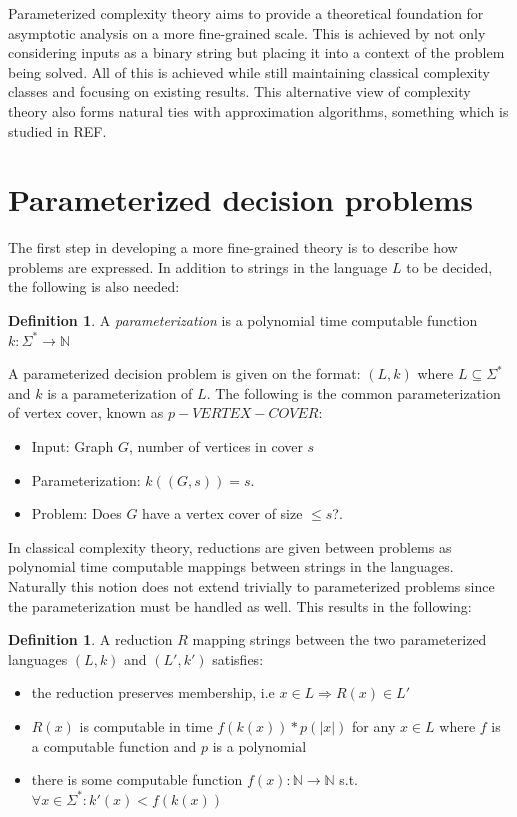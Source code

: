 \documentclass[a4paper,11pt,notitlepage]{report}
\theoremstyle{plain}
\theoremstyle{definition}
\newtheorem{defn}[thm]{Definition} %
\begin{document}
Parameterized complexity theory aims to provide a theoretical foundation for asymptotic analysis on a more fine-grained scale.
This is achieved by not only considering inputs as a binary string but placing it into a context of the problem being solved.
All of this is achieved while still maintaining classical complexity classes and focusing on existing results.
This alternative view of complexity theory also forms natural ties with approximation algorithms, something which is studied in REF.

\section{Parameterized decision problems}
The first step in developing a more fine-grained theory is to describe how problems are expressed.
In addition to strings in the language $L$ to be decided, the following is also needed:

\begin{defn}
A \emph{parameterization} is a polynomial time computable function $k : \Sigma^* \rightarrow \mathbb{N}$
\end{defn}

A parameterized decision problem is given on the format: $(L, k)$ where $L \subseteq \Sigma^*$ and $k$ is a parameterization of $L$.
The following is the common parameterization of vertex cover, known as $p-VERTEX-COVER$:
\begin{itemize}
\item Input: Graph $G$, number of vertices in cover $s$
\item Parameterization: $k((G, s)) = s$.
\item Problem: Does $G$ have a vertex cover of size $\leq s$?.
\end{itemize}

In classical complexity theory, reductions are given between problems as polynomial time computable mappings between strings in the languages.
Naturally this notion does not extend trivially to parameterized problems since the parameterization must be handled as well.
This results in the following:

\begin{defn}
A reduction $R$ mapping strings between the two parameterized languages $(L, k)$ and $(L', k')$ satisfies:
\begin{itemize}
\item the reduction preserves membership, i.e $x \in L \Rightarrow R(x) \in L'$
\item $R(x)$ is computable in time $f(k(x)) * p(|x|)$ for any $x \in L$ where $f$ is a computable function and $p$ is a polynomial
\item there is some computable function $f(x) : \mathbb{N} \rightarrow \mathbb{N}$ s.t. $\forall x \in \Sigma^* : k'(x) < f(k(x))$
\end{itemize}
\end{defn}
\end{document}

